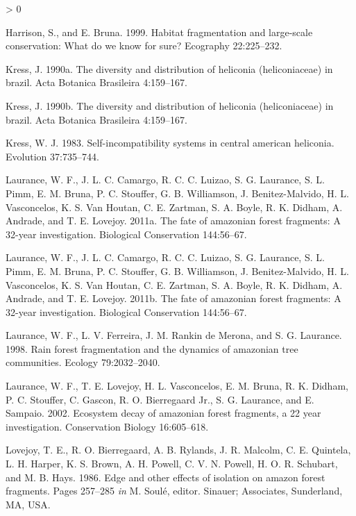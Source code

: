 \documentclass[
  english,
  man]{apa6}
\newlength{\cslhangindent}
\newenvironment{CSLReferences}[2] %
 {%
  \setlength{\parindent}{0pt}
  \ifodd #1 \everypar{\setlength{\hangindent}{\cslhangindent}}\ignorespaces\fi
  \ifnum #2 > 0
  \setlength{\parskip}{#2\baselineskip}
  \fi
 }%
 {}
\begin{document}
\begin{CSLReferences}{1}{0}
\leavevmode\hypertarget{ref-harrison1999}{}%
Harrison, S., and E. Bruna. 1999. Habitat fragmentation and large-scale conservation: What do we know for sure? Ecography 22:225--232.

\leavevmode\hypertarget{ref-kress1990}{}%
Kress, J. 1990a. The diversity and distribution of heliconia (heliconiaceae) in brazil. Acta Botanica Brasileira 4:159--167.

\leavevmode\hypertarget{ref-kress1990a}{}%
Kress, J. 1990b. The diversity and distribution of heliconia (heliconiaceae) in brazil. Acta Botanica Brasileira 4:159--167.

\leavevmode\hypertarget{ref-kress1983}{}%
Kress, W. J. 1983. Self-incompatibility systems in central american heliconia. Evolution 37:735--744.

\leavevmode\hypertarget{ref-laurance2011}{}%
Laurance, W. F., J. L. C. Camargo, R. C. C. Luizao, S. G. Laurance, S. L. Pimm, E. M. Bruna, P. C. Stouffer, G. B. Williamson, J. Benitez-Malvido, H. L. Vasconcelos, K. S. Van Houtan, C. E. Zartman, S. A. Boyle, R. K. Didham, A. Andrade, and T. E. Lovejoy. 2011a. The fate of amazonian forest fragments: A 32-year investigation. Biological Conservation 144:56--67.

\leavevmode\hypertarget{ref-laurance2011a}{}%
Laurance, W. F., J. L. C. Camargo, R. C. C. Luizao, S. G. Laurance, S. L. Pimm, E. M. Bruna, P. C. Stouffer, G. B. Williamson, J. Benitez-Malvido, H. L. Vasconcelos, K. S. Van Houtan, C. E. Zartman, S. A. Boyle, R. K. Didham, A. Andrade, and T. E. Lovejoy. 2011b. The fate of amazonian forest fragments: A 32-year investigation. Biological Conservation 144:56--67.

\leavevmode\hypertarget{ref-laurance1998}{}%
Laurance, W. F., L. V. Ferreira, J. M. Rankin de Merona, and S. G. Laurance. 1998. Rain forest fragmentation and the dynamics of amazonian tree communities. Ecology 79:2032--2040.

\leavevmode\hypertarget{ref-laurance2002}{}%
Laurance, W. F., T. E. Lovejoy, H. L. Vasconcelos, E. M. Bruna, R. K. Didham, P. C. Stouffer, C. Gascon, R. O. Bierregaard Jr., S. G. Laurance, and E. Sampaio. 2002. Ecosystem decay of amazonian forest fragments, a 22 year investigation. Conservation Biology 16:605--618.

\leavevmode\hypertarget{ref-lovejoy1986}{}%
Lovejoy, T. E., R. O. Bierregaard, A. B. Rylands, J. R. Malcolm, C. E. Quintela, L. H. Harper, K. S. Brown, A. H. Powell, C. V. N. Powell, H. O. R. Schubart, and M. B. Hays. 1986. Edge and other effects of isolation on amazon forest fragments. Pages 257--285 \emph{in} M. Soulé, editor. Sinauer; Associates, Sunderland, MA, USA.


\end{CSLReferences}
\end{document}
